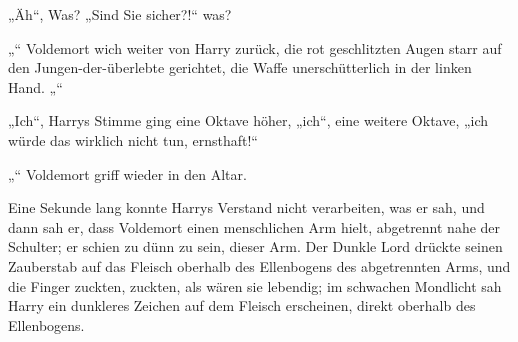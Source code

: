 „Äh“, Was?
„Sind Sie sicher?!“ was?

„“
Voldemort wich weiter von Harry zurück, die rot geschlitzten Augen starr auf den Jungen-der-überlebte gerichtet, die Waffe unerschütterlich in der linken Hand.
„“

„Ich“, Harrys Stimme ging eine Oktave höher,
„ich“, eine weitere Oktave, „ich würde das wirklich nicht tun, ernsthaft!“

„“
Voldemort griff wieder in den Altar.

Eine Sekunde lang konnte Harrys Verstand nicht verarbeiten, was er sah, und dann sah er, dass Voldemort einen menschlichen Arm hielt, abgetrennt nahe der Schulter; er schien zu dünn zu sein, dieser Arm.
Der Dunkle Lord drückte seinen Zauberstab auf das Fleisch oberhalb des Ellenbogens des abgetrennten Arms, und die Finger zuckten, zuckten, als wären sie lebendig; im schwachen Mondlicht sah Harry ein dunkleres Zeichen auf dem Fleisch erscheinen, direkt oberhalb des Ellenbogens.

